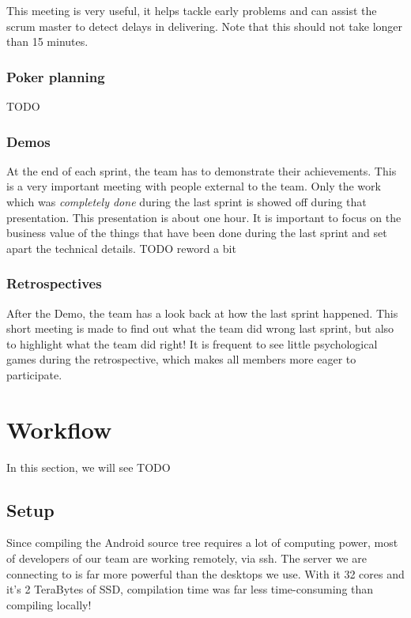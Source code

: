 This meeting is very useful, it helps tackle early problems and can assist the scrum master to detect delays in delivering.
Note that this should not take longer than 15 minutes.


\subsubsection{Poker planning}
TODO


\subsubsection{Demos}
At the end of each sprint, the team has to demonstrate their achievements. This
is a very important meeting with people external to the team. Only the work
which was \emph{completely done} during the last sprint is showed off during that presentation.
This presentation is about one hour. It is important to focus on the business value of the things that
have been done during the last sprint and set apart the technical details.  TODO reword a bit

\subsubsection{Retrospectives}
After the Demo, the team has a look back at how the last sprint happened. This short meeting is made
to find out what the team did wrong last sprint, but also to highlight what the team did right!
It is frequent to see little psychological games during the retrospective, which makes all members more
eager to participate.

\section{Workflow}
In this section, we will see 
TODO

\subsection{Setup}
Since compiling the Android source tree requires a lot of computing power,
most of developers of our team are working remotely, via ssh.
The server we are connecting to is far more powerful than the desktops we use.
With it 32 cores and it's 2 TeraBytes of SSD, compilation time was far less time-consuming
than compiling locally!

